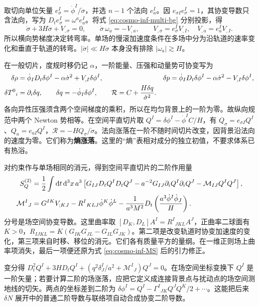 取切向单位矢量 $e_\sigma^I=\dot\phi^I/\dot\sigma$，并选 $n-1$ 个法向 $e_a^I$。因 $e_{\sigma I}e_\sigma^I=1$，其协变导数只含法向，写为 $D_t e_\sigma^I=\omega^a e_a^I$。将式 \eqref{eq:cosmo-inf-multi-bg} 分别投影，得
\[
 \ddot\sigma+3H\dot\sigma+V_{,\sigma}=0,\qquad
 \dot\sigma\,\omega_a=-V_{,a},\qquad
 V_{,\sigma}=e_\sigma^I V_{,I},\quad V_{,a}=e_a^I V_{,I}.
\]
所以横向势梯度决定转弯率。单场的慢滚加速度条件在多场中分为沿轨道的速率变化和垂直于轨道的转弯。$|\ddot\sigma|\ll H\dot\sigma$ 本身没有排除 $|\omega_a|\gtrsim H$。

在一般切片，度规时移仍记 $\alpha$，一阶能量、压强和动量势可协变写为
\begin{align}
 \delta\rho&=\dot\phi_I D_t\delta\phi^I-\alpha\dot\sigma^2+V_{,I}\delta\phi^I,
 &\delta p&=\dot\phi_I D_t\delta\phi^I-\alpha\dot\sigma^2-V_{,I}\delta\phi^I,
 \nonumber\\
 \delta T^0{}_i&=\partial_i\delta q,\qquad
 \delta q=-\dot\phi_I\delta\phi^I,\qquad
 \mathcal R=C+\frac{H\delta q}{\dot\sigma^2}.
 \label{eq:cosmo-inf-multi-fluid}
\end{align}
各向异性压强须含两个空间梯度的乘积，所以在均匀背景上的一阶为零。故纵向规范中两个 Newton 势相等。在空间平直切片取 $Q^I=\delta\phi^I-\dot\phi^I C/H$，有 $Q_\sigma=e_{\sigma I}Q^I$、$Q_a=e_{aI}Q^I$，$\mathcal R=-HQ_\sigma/\dot\sigma$。法向涨落在一阶不随时间切片改变，因背景沿法向的速度为零。它们称为\textbf{熵涨落}。这里的“熵”表相对成分的独立初值，不要求体系已有热浴。

对约束作与单场相同的消元，得到空间平直切片的二阶作用量
\begin{align}
 S_Q^{(2)}&=\frac12\int\dd t\,\dd^3x\,a^3
 \left[G_{IJ}D_tQ^I D_tQ^J-a^{-2}G_{IJ}\partial_iQ^I\partial_iQ^J
       -\mathcal M_{IJ}Q^I Q^J\right],\nonumber\\
 \mathcal M^I{}_J&=G^{IK}V_{;KJ}
 -R^I{}_{KLJ}\dot\phi^K\dot\phi^L
 -\frac1{a^3M^2}D_t\left(\frac{a^3\dot\phi^I\dot\phi_J}{H}\right).
 \label{eq:cosmo-inf-multi-mass}
\end{align}
分号是场空间协变导数。这里曲率取 $[D_K,D_L]A^I=R^I{}_{JKL}A^J$，正曲率二球面有 $K>0$，$R_{IJKL}=K(G_{IK}G_{JL}-G_{IL}G_{JK})$。第二项是改变轨道时协变加速度的变化，第三项来自时移、移位的消元。它们各有质量平方的量纲。在一维正则场上曲率项消失，最后一项便还原为式 \eqref{eq:cosmo-inf-MS} 后的引力修正。

变分得 $D_t^2 Q^I+3H D_tQ^I+(q^2\delta^I_J/a^2+\mathcal M^I{}_J)Q^J=0$。在场空间坐标变换下 $Q^I$ 是一阶矢量；若要计算二阶的场涨落，应把它定义成连接背景点与扰动点的场空间测地线的切矢。两点的坐标差到二阶为 $\delta\phi^I=Q^I-\Gamma^I{}_{JK}Q^JQ^K/2+\cdots$。这能把后来 $\delta N$ 展开中的普通二阶导数与联络项自动合成协变二阶导数。

